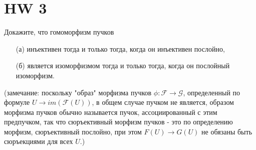 \section{HW 3}

\begin{prob}
Докажите, что гомоморфизм пучков
\begin{itemize}
\item[]
\item[(а)] инъективен тогда и только тогда, когда он инъективен послойно,
\item[(б)] является изоморфизмом тогда и только тогда, когда он послойный изоморфизм.
\end{itemize}
(замечание: поскольку "образ" морфизма пучков $\phi: \mathcal{F} \rightarrow \mathcal{G}$, определенный по формуле $U \to i m(\mathcal{F}(U))$, в общем случае пучком не является, образом морфизма пучков обычно называется пучок, ассоциированный с этим предпучком, так что сюръективный морфизм пучков - это по определению морфизм, сюръективный послойно, при этом $F(U) \rightarrow G(U)$ не обязаны быть сюръекциями для всех $U$.)
\end{prob}
